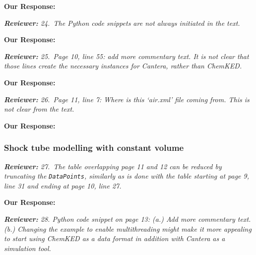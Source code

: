 \documentclass[a4paper,10pt]{elsarticle}
\newenvironment{reviewer}{\vspace{0.5\baselineskip}\begingroup\itshape\textbf{Reviewer:}}{\endgroup\vspace{0.5\baselineskip}}
\newenvironment{response}{\vspace{0.5\baselineskip}\textbf{Our Response:}}{\vspace{0.5\baselineskip}}
\begin{document}
\begin{response}

\end{response}

\begin{reviewer}
    24.~The Python code snippets are not always initiated in the text.
\end{reviewer}

\begin{response}

\end{response}

\begin{reviewer}
    25.~Page 10, line 55: add more commentary text. It is not clear that those lines create the
    necessary instances for Cantera, rather than ChemKED.
\end{reviewer}

\begin{response}

\end{response}

\begin{reviewer}
    26.~Page 11, line 7: Where is this `air.xml' file coming from. This is not clear from the text.
\end{reviewer}

\begin{response}

\end{response}

\subsubsection*{Shock tube modelling with constant volume}

\begin{reviewer}
    27.~The table overlapping page 11 and 12 can be reduced by truncating the \texttt{DataPoints},
    similarly as is done with the table starting at page 9, line 31 and ending at page 10, line 27.
\end{reviewer}

\begin{response}

\end{response}

\begin{reviewer}
    28. Python code snippet on page 13: (a.) Add more commentary text. (b.) Changing the example to
    enable multithreading might make it more appealing to start using ChemKED as a data format in
    addition with Cantera as a simulation tool.
\end{reviewer}
\end{document}
